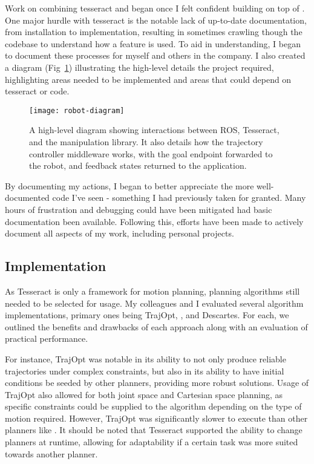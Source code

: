 Work on combining \gls*{tesseract} and  began once I felt confident building on top of
. One major hurdle with \gls*{tesseract} is the notable lack of up-to-date documentation,
from installation to implementation, resulting in sometimes crawling though the codebase to
understand how a feature is used. To aid in understanding, I began to document these processes for
myself and others in the company. I also created a diagram (Fig~\ref{fig:robot-diagram})
illustrating the high-level details the project required, highlighting areas needed to be
implemented and areas that could depend on \gls*{tesseract} or  code.

\begin{figure}
    \centering
    \texttt{[image: robot-diagram]}
    \caption{A high-level diagram showing interactions between ROS, Tesseract, and the manipulation
        library. It also details how the trajectory controller middleware works, with the goal
        endpoint forwarded to the robot, and feedback states returned to the
        application.\label{fig:robot-diagram}}
\end{figure}

By documenting my actions, I began to better appreciate the more well-documented code I've seen -
something I had previously taken for granted. Many hours of frustration and debugging could have
been mitigated had basic documentation been available. Following this, efforts have been made to
actively document all aspects of my work, including personal projects.

\subsection{Implementation}

As Tesseract is only a framework for motion planning, planning algorithms still needed to be
selected for usage. My colleagues and I evaluated several algorithm implementations, primary ones
being TrajOpt, , and Descartes. For each, we outlined the benefits and drawbacks of each
approach along with an evaluation of practical performance.

For instance, TrajOpt was notable in its ability to not only produce reliable trajectories under
complex constraints, but also in its ability to have initial conditions be seeded by other planners,
providing more robust solutions. Usage of TrajOpt also allowed for both joint space and Cartesian
space planning, as specific constraints could be supplied to the algorithm depending on the type of
motion required. However, TrajOpt was significantly slower to execute than other planners like
. It should be noted that Tesseract supported the ability to change planners at runtime,
allowing for adaptability if a certain task was more suited towards another planner.

